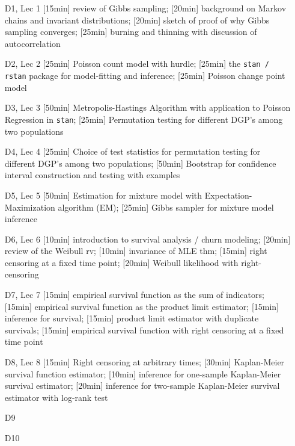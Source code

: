 \begin{enumerate}
\item[D1, Lec 1] [15min] review of Gibbs sampling;  [20min] background on Markov chains and invariant distributions; [20min] sketch of proof of why Gibbs sampling converges; [25min] burning and thinning with discussion of autocorrelation

\item[D2, Lec 2] [25min] Poisson count model with hurdle; [25min] the \texttt{stan / rstan} package for model-fitting and inference; [25min] Poisson change point model

\item[D3, Lec 3] [50min] Metropolis-Hastings Algorithm with application to Poisson Regression in \texttt{stan}; [25min] Permutation testing for different DGP's among two populations

\item[D4, Lec 4] [25min] Choice of test statistics for permutation testing for different DGP's among two populations; [50min] Bootstrap for confidence interval construction and testing with examples

\item[D5, Lec 5] [50min] Estimation for mixture model with Expectation-Maximization algorithm (EM); [25min] Gibbs sampler for mixture model inference

\item[D6, Lec 6] [10min] introduction to survival analysis / churn modeling; [20min] review of the Weibull rv; [10min] invariance of MLE thm; [15min] right censoring at a fixed time point; [20min] Weibull likelihood with right-censoring


\item[D7, Lec 7] [15min] empirical survival function as the sum of indicators; [15min] empirical survival function as the product limit estimator; [15min] inference for survival; [15min] product limit estimator with duplicate survivals; [15min] empirical survival function with right censoring at a fixed time point

\item[D8, Lec 8] [15min] Right censoring at arbitrary times; [30min] Kaplan-Meier survival function estimator; [10min] inference for one-sample Kaplan-Meier survival estimator; [20min]  inference for two-sample Kaplan-Meier survival estimator with log-rank test

\item[D9] 
\item[D10] 


\end{enumerate}
